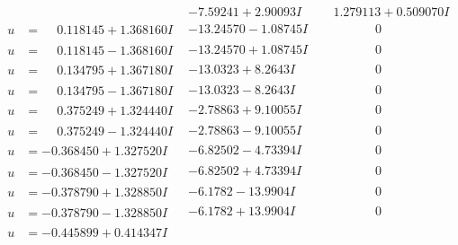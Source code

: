 \documentclass[1p]{elsarticle_modified}
\theoremstyle{definition}
\begin{document}
$$\begin{array}{c|c|c}
 & -7.59241 + 2.90093 I & \phantom{-}1.279113 + 0.509070 I \\ \hline\begin{aligned}
u &= \phantom{-}0.118145 + 1.368160 I\end{aligned}
 & -13.24570 - 1.08745 I & \phantom{-0.000000 } 0 \\ \hline\begin{aligned}
u &= \phantom{-}0.118145 - 1.368160 I\end{aligned}
 & -13.24570 + 1.08745 I & \phantom{-0.000000 } 0 \\ \hline\begin{aligned}
u &= \phantom{-}0.134795 + 1.367180 I\end{aligned}
 & -13.0323 + 8.2643 I & \phantom{-0.000000 } 0 \\ \hline\begin{aligned}
u &= \phantom{-}0.134795 - 1.367180 I\end{aligned}
 & -13.0323 - 8.2643 I & \phantom{-0.000000 } 0 \\ \hline\begin{aligned}
u &= \phantom{-}0.375249 + 1.324440 I\end{aligned}
 & -2.78863 + 9.10055 I & \phantom{-0.000000 } 0 \\ \hline\begin{aligned}
u &= \phantom{-}0.375249 - 1.324440 I\end{aligned}
 & -2.78863 - 9.10055 I & \phantom{-0.000000 } 0 \\ \hline\begin{aligned}
u &= -0.368450 + 1.327520 I\end{aligned}
 & -6.82502 - 4.73394 I & \phantom{-0.000000 } 0 \\ \hline\begin{aligned}
u &= -0.368450 - 1.327520 I\end{aligned}
 & -6.82502 + 4.73394 I & \phantom{-0.000000 } 0 \\ \hline\begin{aligned}
u &= -0.378790 + 1.328850 I\end{aligned}
 & -6.1782 - 13.9904 I & \phantom{-0.000000 } 0 \\ \hline\begin{aligned}
u &= -0.378790 - 1.328850 I\end{aligned}
 & -6.1782 + 13.9904 I & \phantom{-0.000000 } 0 \\ \hline\begin{aligned}
u &= -0.445899 + 0.414347 I\end{aligned}

\end{array}$$
\end{document}
